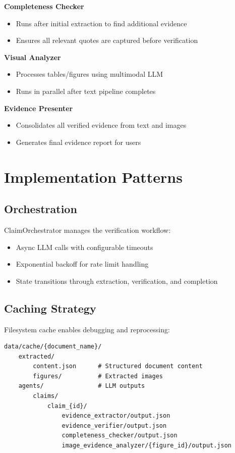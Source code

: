 \documentclass[11pt]{article}
\begin{document}
\textbf{Completeness Checker}
\begin{itemize}
\item Runs after initial extraction to find additional evidence
\item Ensures all relevant quotes are captured before verification
\end{itemize}

\textbf{Visual Analyzer}
\begin{itemize}
\item Processes tables/figures using multimodal LLM
\item Runs in parallel after text pipeline completes
\end{itemize}

\textbf{Evidence Presenter}
\begin{itemize}
\item Consolidates all verified evidence from text and images
\item Generates final evidence report for users
\end{itemize}

\section{Implementation Patterns}

\subsection{Orchestration}

ClaimOrchestrator manages the verification workflow:
\begin{itemize}
\item Async LLM calls with configurable timeouts
\item Exponential backoff for rate limit handling
\item State transitions through extraction, verification, and completion
\end{itemize}

\subsection{Caching Strategy}

Filesystem cache enables debugging and reprocessing:

\begin{verbatim}
data/cache/{document_name}/
    extracted/
        content.json      # Structured document content
        figures/          # Extracted images
    agents/               # LLM outputs
        claims/
            claim_{id}/
                evidence_extractor/output.json
                evidence_verifier/output.json
                completeness_checker/output.json
                image_evidence_analyzer/{figure_id}/output.json
\end{verbatim}
\end{document}
